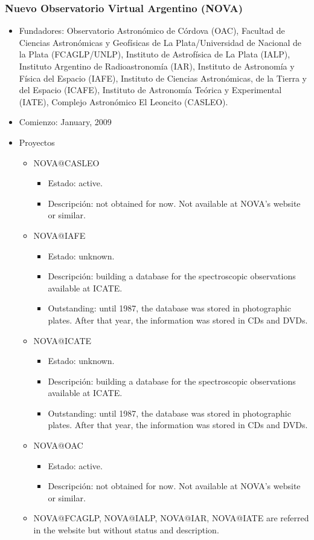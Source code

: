 \subsubsection{Nuevo Observatorio Virtual Argentino (NOVA)}
	\begin{itemize}
		\item Fundadores: Observatorio Astronómico de Córdova (OAC),
			Facultad de Ciencias Astronómicas y Geofísicas de La Plata/Universidad de
			Nacional de la Plata (FCAGLP/UNLP), Instituto de Astrofísica de La Plata
			(IALP), Instituto Argentino de Radioastronomía (IAR), Instituto de Astronomía y
			Física del Espacio (IAFE), Instituto de Ciencias Astronómicas, de la Tierra y
			del Espacio (ICAFE), Instituto de Astronomía Teórica y Experimental (IATE),
			Complejo Astronómico El Leoncito (CASLEO).
		\item Comienzo: January, 2009
		\item Proyectos
		\begin{itemize}
			\item NOVA@CASLEO
			\begin{itemize}
				\item Estado: active.
				\item Descripción: not obtained for now. Not available at NOVA's website or similar.
			\end{itemize}
			\item NOVA@IAFE
			\begin{itemize}
				\item Estado: unknown.
				\item Descripción: building a database for the spectroscopic observations available at ICATE.
				\item Outstanding: until 1987, the database was stored in photographic plates. After that year, the information was stored in CDs and DVDs.
			\end{itemize}
			\item NOVA@ICATE
			\begin{itemize}
				\item Estado: unknown.
				\item Descripción: building a database for the spectroscopic observations available at ICATE.
				\item Outstanding: until 1987, the database was stored in photographic plates.
					After that year, the information was stored in CDs and DVDs.
			\end{itemize}
			\item NOVA@OAC
			\begin{itemize}
				\item Estado: active.
				\item Descripción: not obtained for now. Not available at NOVA's website or similar.
			\end{itemize}
			\item NOVA@FCAGLP, NOVA@IALP, NOVA@IAR, NOVA@IATE are referred in the website but without status and description.
		\end{itemize}
	\end{itemize}

